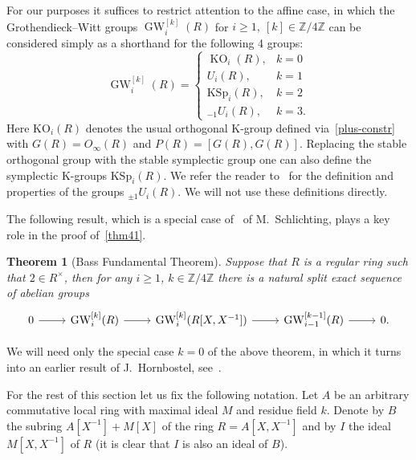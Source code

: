 \documentclass[10pt,a4paper,twoside]{article}
\newtheorem{externaltheorem}[lemma]{Theorem}
\theoremstyle{remark}
\theoremstyle{definition}
\numberwithin{lemma}{section}
\numberwithin{prop}{section}
\numberwithin{corollary}{section}
\numberwithin{externaltheorem}{section}
\DeclareMathOperator{\KO}{KO}
\DeclareMathOperator{\GW}{GW}
\newcommand{\ZZ}{\mathbb{Z}}
\numberwithin{equation}{section}
\begin{document}
For our purposes it suffices to restrict attention to the affine case, in which  the Grothendieck--Witt groups $\GW_i^{[k]}(R)$ for $i \geq 1,\ [k] \in \ZZ/4\ZZ$ can be considered simply as a shorthand for the following 4 groups:
\begin{equation} \label{GW-concrete} \GW_i^{[k]}(R) = \left\{\begin{array}{ll} \KO_i(R), & k = 0 \\ U_i(R), & k = 1 \\ \mathrm{KSp}_i(R), & k = 2 \\ {}_{-1}\!U_i(R), & k = 3. \end{array}\right. \end{equation}
Here $\mathrm{KO}_i(R)$ denotes the usual orthogonal K-group defined via~\eqref{plus-constr} with $G(R) = O_\infty(R)$ and $P(R) = [G(R), G(R)]$.
Replacing the stable orthogonal group with the stable symplectic group one can also define the symplectic K-groups $\mathrm{KSp}_i(R)$.
We refer the reader to~\cite{Ka80} for the definition and properties of the groups ${}_{\pm 1}\!U_i(R)$. We will not use these definitions directly.

The following result, which is a special case of~\cite[Theorem~9.13]{Sch16} of M.~Schlichting, plays a key role in the proof of~\cref{thm41}.
\begin{externaltheorem}[Bass Fundamental Theorem]\label{bass-ft} Suppose that $R$ is a regular ring such that $2 \in R^\times$, 
then for any $i\geq 1$, $k\in \ZZ/4\ZZ$ there is a natural split exact sequence of abelian groups 
\[ \begin{tikzcd} 0 \arrow{r} & \GW_i^{[k]}(R) \arrow{r} & \GW_i^{[k]}(R[X, X^{-1}]) \arrow{r} & \GW_{i-1}^{[k-1]}(R) \arrow{r} & 0. \end{tikzcd} \] \end{externaltheorem}
We will need only the special case $k=0$ of the above theorem, in which it turns into an earlier result of J.~Hornbostel, see~\cite[Corollary~5.3]{Ho05}.

For the rest of this section let us fix the following notation.
Let $A$ be an arbitrary commutative local ring with maximal ideal $M$ and residue field $k$.
Denote by $B$ the subring $A[X^{-1}] + M[X]$ of the ring $R = A[X, X^{-1}]$ and
by $I$ the ideal $M[X, X^{-1}]$ of $R$ (it is clear that $I$ is also an ideal of $B$).
\end{document}
